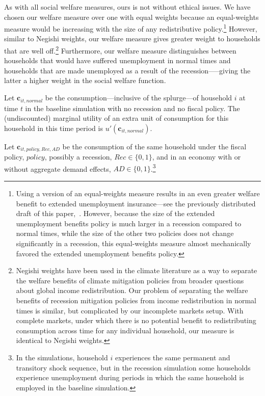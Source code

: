 \documentclass[../HAFiscal]{subfiles}
\begin{document}
As with all social welfare measures, ours is not without ethical issues.
We have chosen our welfare measure over one with equal weights because an equal-weights measure would be increasing with the size of any redistributive policy.\footnote{Using a version of an equal-weights measure results in an even greater welfare benefit to extended unemployment insurance---see the previously distributed draft of this paper,~\cite{carroll2023welfare}.
However, because the size of the extended unemployment benefits policy is much larger in a recession compared to normal times, while the size of the other two policies does not change significantly in a recession, this equal-weights measure almost mechanically favored the extended unemployment benefits policy.}
However, similar to Negishi weights, our welfare measure gives greater weight to households that are well off.\footnote{Negishi weights have been used in the climate literature as a way to separate the welfare benefits of climate mitigation policies from broader questions about global income redistribution.
Our problem of separating the welfare benefits of recession mitigation policies from income redistribution in normal times is similar, but complicated by our incomplete markets setup.
With complete markets, under which there is no potential benefit to redistributing consumption across time for any individual household, our measure is identical to Negishi weights.}
Furthermore, our welfare measure distinguishes between households that would have suffered unemployment in normal times and households that are made unemployed as a result of the recession—--giving the latter a higher weight in the social welfare function.

Let $\mathbf{c}_{it,\textit{normal}}$ be the consumption---inclusive of the splurge---of household $i$ at time $t$ in the baseline simulation with no recession and no fiscal policy.
The (undiscounted) marginal utility of an extra unit of consumption for this household in this time period is $ u'(\mathbf{c}_{it,\textit{normal}})$.

Let $\mathbf{c}_{it,\textit{policy},Rec,AD}$ be the consumption of the same household under the fiscal policy, $\textit{policy}$, possibly a recession, $Rec \in \{0,1\}$, and in an economy with or without aggregate demand effects, $AD \in \{0,1\}$.\footnote{In the simulations, household $i$ experiences the same permanent and transitory shock sequence, but in the recession simulation some households experience unemployment during periods in which the same household is employed in the baseline simulation.}
\end{document}
